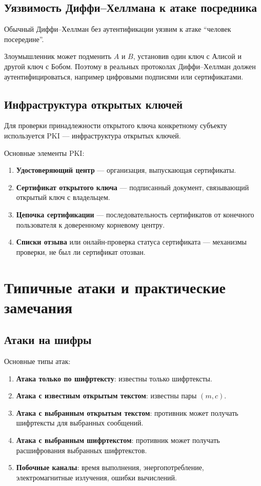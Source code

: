\documentclass[12pt,a4paper]{article}
\begin{document}
\subsection{Уязвимость Диффи--Хеллмана к атаке посредника}

Обычный Диффи--Хеллман без аутентификации уязвим к атаке ``человек посередине''.

Злоумышленник может подменить $A$ и $B$, установив один ключ с Алисой и другой ключ с Бобом. Поэтому в реальных протоколах Диффи--Хеллман должен аутентифицироваться, например цифровыми подписями или сертификатами.

\subsection{Инфраструктура открытых ключей}

Для проверки принадлежности открытого ключа конкретному субъекту используется PKI --- инфраструктура открытых ключей.

Основные элементы PKI:

\begin{enumerate}
    \item \textbf{Удостоверяющий центр} --- организация, выпускающая сертификаты.
    \item \textbf{Сертификат открытого ключа} --- подписанный документ, связывающий открытый ключ с владельцем.
    \item \textbf{Цепочка сертификации} --- последовательность сертификатов от конечного пользователя к доверенному корневому центру.
    \item \textbf{Списки отзыва} или онлайн-проверка статуса сертификата --- механизмы проверки, не был ли сертификат отозван.
\end{enumerate}

\section{Типичные атаки и практические замечания}

\subsection{Атаки на шифры}

Основные типы атак:

\begin{enumerate}
    \item \textbf{Атака только по шифртексту}: известны только шифртексты.
    \item \textbf{Атака с известным открытым текстом}: известны пары $(m,c)$.
    \item \textbf{Атака с выбранным открытым текстом}: противник может получать шифртексты для выбранных сообщений.
    \item \textbf{Атака с выбранным шифртекстом}: противник может получать расшифрования выбранных шифртекстов.
    \item \textbf{Побочные каналы}: время выполнения, энергопотребление, электромагнитные излучения, ошибки вычислений.
\end{enumerate}
\end{document}
